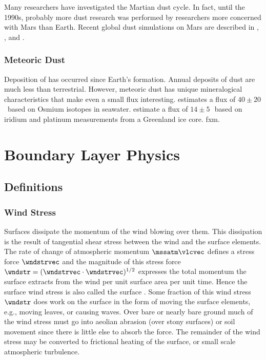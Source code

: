 \documentclass[12pt,twoside]{book}
\begin{document}
Many researchers have investigated the Martian dust cycle.
In fact, until the 1990s, probably more dust research was performed by
researchers more concerned with Mars than Earth.
Recent global dust simulations on Mars are described in \cite{PaI02}, 
\cite{NLR02}, and \cite{BRW04}.

\subsection[Meteoric Dust]{Meteoric Dust}\label{sxn:ltr_rvw_mtr}
Deposition of  has occurred since Earth's
formation. 
Annual deposits of  dust are much less than 
terrestrial.
However, meteoric dust has unique mineralogical characteristics that
make even a small flux interesting.
\cite{PRH94} estimates a flux of $40 \pm 20$\,\ktxyr\ based on Osmium
isotopes in seawater.
\cite{GBP04} estimate a flux of $14 \pm 5$\,\ktxyr\ based on iridium
and platinum measurements from a Greenland ice core.
\cite{MRG06} fxm.

\chapter{Boundary Layer Physics}\label{sxn:blp}

\section{Definitions}

\subsection[Wind Stress]{Wind Stress}\label{sxn:wnd_str}
Surfaces dissipate the momentum of the wind blowing over them.
This dissipation is the result of tangential shear stress between the
wind and the surface elements.
The rate of change of atmospheric momentum $\mssatm \vlcvec$ defines a
stress force $\wndstrvec$ and the magnitude of this stress force
$\wndstr = (\wndstrvec \cdot \wndstrvec)^{1/2}$ expresses the total
momentum the surface extracts from the wind per unit surface area per
unit time.
Hence the surface wind stress is also called the surface 
.
Some fraction of this wind stress $\wndstr$ does work on the surface
in the form of moving the surface elements, e.g., moving leaves,
or causing waves.
Over bare or nearly bare ground much of the wind stress must go into
aeolian abrasion (over stony surfaces) or soil movement since there is
little else to absorb the force.
The remainder of the wind stress may be converted to frictional
heating of the surface, or small scale atmospheric turbulence.
\end{document}
